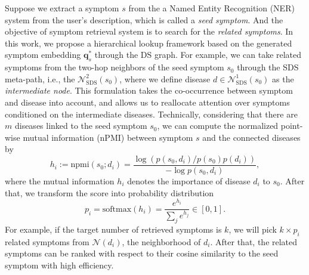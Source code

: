 \documentclass[sigconf]{acmart}
\newcommand{\q}{\bm{q}}
\newcommand{\bn}{\mathcal{N}}
\newcommand{\npmi}{\text{npmi}}
\begin{document}
Suppose we extract a symptom $s$ from the a Named Entity Recognition (NER) system from the user's description, which is called a \emph{seed symptom}. And the objective of symptom retrieval system is to search for the \emph{related symptoms}. In this work, we propose a hierarchical lookup framework based on the generated symptom embedding $\q_s^*$ through the DS graph. For example, we can take related symptoms from the two-hop neighbors of the seed symptom $s_0$ through the SDS meta-path, i.e., the $\bn_{\text{SDS}}^2(s_0)$, where we define disease $d \in \bn^1_{\text{SDS}}(s_0)$ as the \emph{intermediate node}. This formulation takes the co-occurrence between symptom and disease into account, and allows us to reallocate attention over symptoms conditioned on the intermediate diseases. Technically, considering that there are $m$ diseases linked to the seed symptom $s_0$, we can compute the normalized point-wise mutual information (nPMI) \cite{bouma2009normalized} between symptom $s$ and the connected diseases by
\begin{equation}
h_i := \npmi(s_0;d_i) = \frac{\log({p(s_0, d_i)}/{p(s_0)p(d_i)})}{-\log p(s_0, d_i)},
\end{equation}
where the mutual information $h_i$ denotes the importance of disease $d_i$ to $s_0$. After that, we transform the score into probability distribution
\begin{equation}
p_i = \text{softmax}(h_i) = \frac{e^{h_i}}{\sum_j e^{h_j}} \in [0,1].
\end{equation}
For example, if the target number of retrieved symptoms is $k$, we will pick $k \times p_i$ related symptoms from $\bn(d_i)$, the neighborhood of $d_i$. After that, the related symptoms can be ranked with respect to their cosine similarity to the seed symptom with high efficiency.
\end{document}
